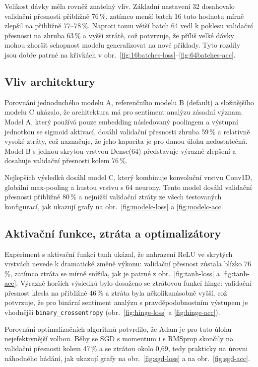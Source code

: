 \documentclass[a4paper,oneside,11pt,usenames,dvipsnames]{article}
\begin{document}
Velikost dávky měla rovněž znatelný vliv. Základní nastavení 32 dosahovalo validační přesnosti přibližně 76\,\%, zatímco menší batch 16 tuto hodnotu mírně zlepšil na přibližně 77--78\,\%. Naproti tomu větší batch 64 vedl k poklesu validační přesnosti na zhruba 63\,\% a vyšší ztrátě, což potvrzuje, že příliš velké dávky mohou zhoršit schopnost modelu generalizovat na nové příklady. Tyto rozdíly jsou dobře patrné na křivkách v obr.~\ref{fig:16batches-loss}--\ref{fig:64batches-acc}.

\subsection{Vliv architektury}
\label{subsec:vliv-architektury}
Porovnání jednoduchého modelu A, referenčního modelu B (default) a složitějšího modelu C ukázalo, že architektura má pro sentiment analýzu zásadní význam. Model A, který používá pouze embedding následovaný poolingem a výstupní jednotkou se sigmoid aktivací, dosáhl validační přesnosti zhruba 59\,\% a relativně vysoké ztráty, což naznačuje, že jeho kapacita je pro danou úlohu nedostatečná. Model B s jednou skrytou vrstvou Dense(64) představuje výrazné zlepšení a dosahuje validační přesnosti kolem 76\,\%.

Nejlepších výsledků dosáhl model C, který kombinuje konvoluční vrstvu Conv1D, globální max-pooling a hustou vrstvu s 64 neurony. Tento model dosáhl validační přesnosti přibližně 80\,\% a nejnižší validační ztráty ze všech testovaných konfigurací, jak ukazují grafy na obr.~\ref{fig:modelc-loss} a \ref{fig:modelc-acc}.

\subsection{Aktivační funkce, ztráta a optimalizátory}
\label{subsec:aktivacni-funkce-ztrata-a-optimalizatory}
Experiment s aktivační funkcí tanh ukázal, že nahrazení ReLU ve skrytých vrstvách nevede k dramatické změně výkonu: validační přesnost zůstala blízko 76\,\%, zatímco ztráta se mírně snížila, jak je patrné z obr.~\ref{fig:tanh-loss} a \ref{fig:tanh-acc}. Výrazně horších výsledků bylo dosaženo se ztrátovou funkcí hinge: validační přesnost klesla na přibližně 46\,\% a ztráta byla několikanásobně vyšší, což potvrzuje, že pro binární sentiment analýzu s pravděpodobnostním výstupem je vhodnější \texttt{binary\_crossentropy} (obr.~\ref{fig:hinge-loss} a \ref{fig:hinge-acc}).

Porovnání optimalizačních algoritmů potvrdilo, že Adam je pro tuto úlohu nejefektivnější volbou. Běhy se SGD s momentum i s RMSprop skončily na validační přesnosti kolem 47\,\% a se ztrátou okolo 0{,}69, tedy prakticky na úrovni náhodného hádání, jak ukazují grafy na obr.~\ref{fig:sgd-loss} a na obr.~\ref{fig:sgd-acc}.
\end{document}
